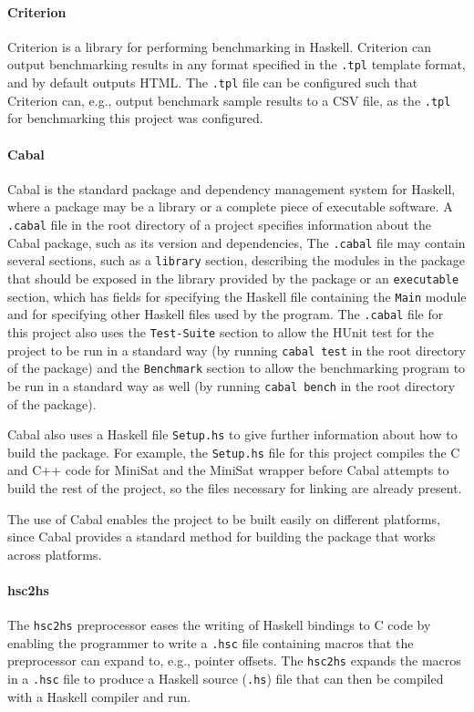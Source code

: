 \documentclass[12pt,a4paper,twoside,openright]{report}
\begin{document}
\paragraph{Criterion}{
Criterion \cite{criterion} is a library for performing benchmarking in Haskell.
Criterion can output benchmarking results in any format specified in the \verb,.tpl,
template format, and by default outputs HTML.
The \verb,.tpl, file can be configured such that
Criterion can, e.g., output benchmark sample results to a CSV file, as the
\verb,.tpl, for benchmarking this project was configured.}

\paragraph{Cabal}{
Cabal \cite{cabal} is the standard package and dependency management system for Haskell,
where a package may be a library or a complete piece of executable software.
A \verb,.cabal, file in the root directory of a project specifies
information about the Cabal package, such as its version and dependencies,
The \verb,.cabal, file may contain several sections, such as a
\verb,library, section, describing the modules in the package that should be
exposed in the library provided by the package or an \verb,executable, section,
which has fields for specifying the Haskell file containing the \verb,Main,
module and for specifying other Haskell files used by the program.
The \verb,.cabal, file for this project also uses the \verb,Test-Suite, section
to allow the HUnit test for the project to be run in a standard way (by running
\verb,cabal test, in the root directory of the package) and the \verb,Benchmark,
section to allow the benchmarking program to be run in a standard way as well
(by running \verb,cabal bench, in the root directory of the package).

Cabal also uses a Haskell file \verb,Setup.hs, to give further information
about how to build the package. For example, the \verb,Setup.hs, file
for this project compiles the C and C++ code for MiniSat and the MiniSat
wrapper before Cabal attempts to build the rest of the project, so the
files necessary for linking are already present.

The use of Cabal enables the project to be built easily on different platforms,
since Cabal provides a standard method for building the package that works
across platforms.}

\paragraph{hsc2hs}{
The \verb,hsc2hs, preprocessor \cite{hsc2hs} eases the writing of Haskell bindings to C
code by enabling the programmer to write a \verb,.hsc, file containing
macros that the preprocessor can expand to, e.g., pointer offsets. The
\verb,hsc2hs, expands the macros in a \verb,.hsc, file to produce a
Haskell source (\verb,.hs,) file that can then be compiled with a Haskell compiler and run.
}
\end{document}
